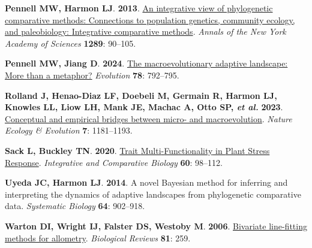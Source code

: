\documentclass[
  letterpaper,
  DIV=11,
  numbers=noendperiod]{scrartcl}
\newlength{\cslhangindent}
\newenvironment{CSLReferences}[2] %
 {\begin{list}{}{%
  \setlength{\itemindent}{0pt}
  \setlength{\leftmargin}{0pt}
  \setlength{\parsep}{0pt}
  \ifodd #1
   \setlength{\leftmargin}{\cslhangindent}
   \setlength{\itemindent}{-1\cslhangindent}
  \fi
  \setlength{\itemsep}{#2\baselineskip}}}
 {\end{list}}
\begin{document}
\begin{CSLReferences}{0}{1}
\textbf{\textbf{Pennell MW}, \textbf{Harmon LJ}}. \textbf{2013}.
\href{https://doi.org/10.1111/nyas.12157}{An integrative view of
phylogenetic comparative methods: Connections to population genetics,
community ecology, and paleobiology: {Integrative} comparative methods}.
\emph{Annals of the New York Academy of Sciences} \textbf{1289}:
90--105.

\textbf{\textbf{Pennell MW}, \textbf{Jiang D}}. \textbf{2024}.
\href{https://doi.org/10.1093/evolut/qpae015}{The macroevolutionary
adaptive landscape: More than a metaphor?} \emph{Evolution} \textbf{78}:
792--795.

\textbf{\textbf{Rolland J}, \textbf{Henao-Diaz LF}, \textbf{Doebeli M},
\textbf{Germain R}, \textbf{Harmon LJ}, \textbf{Knowles LL},
\textbf{Liow LH}, \textbf{Mank JE}, \textbf{Machac A}, \textbf{Otto SP},
\emph{et al.}} \textbf{2023}.
\href{https://doi.org/10.1038/s41559-023-02116-7}{Conceptual and
empirical bridges between micro- and macroevolution}. \emph{Nature
Ecology \& Evolution} \textbf{7}: 1181--1193.

\textbf{\textbf{Sack L}, \textbf{Buckley TN}}. \textbf{2020}.
\href{https://doi.org/10.1093/icb/icz152}{Trait {Multi}-{Functionality}
in {Plant} {Stress} {Response}}. \emph{Integrative and Comparative
Biology} \textbf{60}: 98--112.

\textbf{\textbf{Uyeda JC}, \textbf{Harmon LJ}}. \textbf{2014}. A novel
{Bayesian} method for inferring and interpreting the dynamics of
adaptive landscapes from phylogenetic comparative data. \emph{Systematic
Biology} \textbf{64}: 902--918.

\textbf{\textbf{Warton DI}, \textbf{Wright IJ}, \textbf{Falster DS},
\textbf{Westoby M}}. \textbf{2006}.
\href{https://doi.org/10.1017/S1464793106007007}{Bivariate line-fitting
methods for allometry}. \emph{Biological Reviews} \textbf{81}: 259.

\end{CSLReferences}
\end{document}
